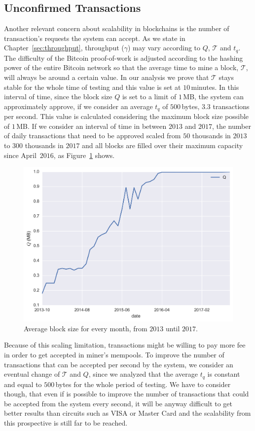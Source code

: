 \documentclass[USenglish]{uit-thesis}
\begin{document}
\subsection{Unconfirmed Transactions}
\label{sec:unconfirmedtxs}
Another relevant concern about scalability in blockchains
is the number of transaction's requests the system
can accept. As we state in Chapter~\ref{sec:throughput},
throughput ($\gamma$) may vary according to $Q$,
$\mathcal{T}$ and $t_q$.
The difficulty of the Bitcoin proof-of-work
is adjusted according to the hashing power of the entire
Bitcoin network so that the average time to mine a block, $\mathcal{T}$,
will always be around a certain value. In our analysis we prove
that $\mathcal{T}$ stays stable for the whole time of testing and this
value is set at $10$\,minutes. In this interval of time, since
the block size $Q$ is set to a limit of $1$\,MB, the system can
approximately approve, if we consider an average $t_q$
of $500$\,bytes, $3.3$ transactions per second. This value is calculated
considering the maximum block size possible of $1$\,MB.
If we consider an interval of time in between $2013$ and
$2017$, the number of daily transactions that need to be approved
scaled from $50$ thousands in $2013$ to $300$ thousands
in $2017$ and all blocks are filled over their maximum
capacity since April~$2016$, as Figure~\ref{fig:block_size} shows.
\begin{figure}[h]
	\centering
	\includegraphics[width=1\textwidth]{img/block_size}
	\caption{Average block size for every month, from $2013$ until $2017$.}
	\label{fig:block_size}
\end{figure}
Because of this scaling limitation, transactions might be willing
to pay more fee in order to get accepted in miner's mempools.
To improve the number of transactions that can be
accepted per second by the system, we consider
an eventual change of $\mathcal{T}$ and $Q$, since
we analyzed that the average $t_q$ is constant and equal to
$500$\,bytes for the whole period of testing.
We have to consider though, that even if is possible
to improve the number of transactions that could be
accepted from the system every second, it will be anyway
difficult to get better results than circuits such
as VISA or Master Card and the scalability from this
prospective is still far to be reached.
\end{document}
